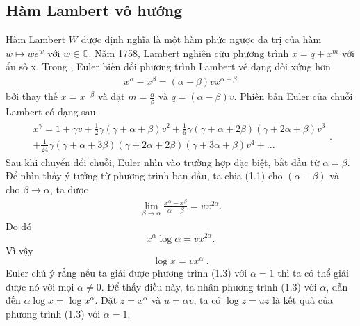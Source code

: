 \subsection{Hàm Lambert vô hướng}       
Hàm Lambert $W$ được định nghĩa là một hàm phức ngược đa trị của hàm $w \mapsto we^{w}$ với $w \in \mathbb{C}$. Năm 1758, Lambert nghiên cứu phương trình $x = q + x^{m}$ với ẩn số x. Trong \cite{Eul77}, Euler biến đổi phương trình Lambert về dạng đối xứng hơn 
%
\begin{align} x^{\alpha} - x^{\beta} = (\alpha - \beta)vx^{\alpha + \beta} \end{align}
%
bởi thay thế $x = x^{-\beta}$ và đặt $m = \frac{\alpha}{\beta}$ và $q = (\alpha - \beta)v$.
Phiên bản Euler của chuỗi Lambert có dạng sau 
\begin{align}
\begin{split}
x^{\gamma} = 1 + \gamma v + \frac{1}{2}\gamma(\gamma + \alpha + \beta)v^{2} + \frac{1}{6}\gamma(\gamma + \alpha + 2\beta)(\gamma + 2\alpha + \beta)v^{3} \\ + \frac{1}{24}\gamma(\gamma + \alpha + 3\beta)(\gamma + 2\alpha + 2\beta)(\gamma + 3\alpha + \beta)v^{4} + ...
\end{split}.
\end{align}
Sau khi chuyển đổi chuỗi, Euler nhìn vào trường hợp đặc biệt, bắt đầu từ $\alpha = \beta$. Để nhìn thấy ý tưởng từ phương trình ban đầu, ta chia (1.1) cho $(\alpha - \beta)$ và cho $\beta \rightarrow \alpha$, ta được
%
\begin{align*}
\displaystyle \lim_{\beta \to \alpha}\frac{x^{\alpha}-x^{\beta}}{\alpha - \beta} = vx^{2\alpha}.
\end{align*}
%
Do đó
%
\[
x^{\alpha}\log \alpha = vx^{2\alpha}.
\]
%
Vì vậy
\[
\log x = vx^{\alpha} \ .
\]
%
Euler chú ý rằng nếu ta giải được phương trình (1.3) với $\alpha = 1$ thì ta có thể giải được nó với mọi $\alpha \neq 0$. Để thấy điều này, ta nhân phương trình (1.3) với $\alpha$, dẫn đến $\alpha \log x = \log x^{\alpha}$. Đặt $z = x^{\alpha}$ và $u = \alpha v$, ta có $\log z = u z$ là kết quả của phương trình (1.3) với $\alpha = 1$. \\


